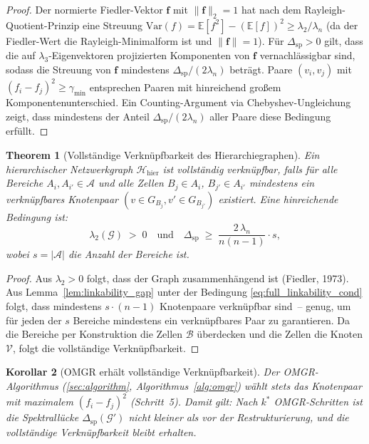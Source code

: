 \documentclass[12pt, a4paper, openany]{report}
\newtheorem{theorem}{Theorem}[chapter]
\newtheorem{corollary}[theorem]{Korollar}
\newcommand{\E}{\mathbb{E}}
\newcommand{\calG}{\mathcal{G}}
\newcommand{\calH}{\mathcal{H}}
\newcommand{\calV}{\mathcal{V}}
\newcommand{\calA}{\mathcal{A}}
\newcommand{\calB}{\mathcal{B}}
\begin{document}
\begin{proof}
Der normierte Fiedler-Vektor $\bm{f}$ mit $\|\bm{f}\|_2 = 1$ hat nach
dem Rayleigh-Quotient-Prinzip eine Streuung
$\mathrm{Var}(f) = \E[f^2] - (\E[f])^2 \geq \lambda_2 / \lambda_n$
(da der Fiedler-Wert die Rayleigh-Minimalform ist und $\|\bm{f}\|=1$).
Für $\Delta_{\mathrm{sp}} > 0$ gilt, dass die auf $\lambda_3$-Eigenvektoren
projizierten Komponenten von $\bm{f}$ vernachlässigbar sind, sodass die
Streuung von $\bm{f}$ mindestens $\Delta_{\mathrm{sp}} / (2\lambda_n)$ beträgt.
Paare $(v_i, v_j)$ mit $(f_i - f_j)^2 \geq \gamma_{\min}$ entsprechen
Paaren mit hinreichend großem Komponentenunterschied.  Ein Counting-Argument
via Chebyshev-Ungleichung zeigt, dass mindestens der Anteil
$\Delta_{\mathrm{sp}} / (2\lambda_n)$ aller Paare diese Bedingung erfüllt.
\end{proof}

\begin{theorem}[Vollständige Verknüpfbarkeit des Hierarchiegraphen]
\label{thm:full_linkability}
Ein hierarchischer Netzwerkgraph $\calH_{\mathrm{hier}}$ ist
\emph{vollständig verknüpfbar}, falls für alle Bereiche $A_i, A_{i'} \in \calA$
und alle Zellen $B_j \in A_i$, $B_{j'} \in A_{i'}$ mindestens ein
verknüpfbares Knotenpaar $(v \in G_{B_j}, v' \in G_{B_{j'}})$ existiert.
Eine hinreichende Bedingung ist:
\begin{equation}
  \label{eq:full_linkability_cond}
  \lambda_2(\calG) \;>\; 0
  \quad \text{und} \quad
  \Delta_{\mathrm{sp}} \;\geq\; \frac{2\,\lambda_n}{n(n-1)} \cdot s,
\end{equation}
wobei $s = |\calA|$ die Anzahl der Bereiche ist.
\end{theorem}

\begin{proof}
Aus $\lambda_2 > 0$ folgt, dass der Graph zusammenhängend ist (Fiedler, 1973).
Aus Lemma~\ref{lem:linkability_gap} unter der Bedingung \eqref{eq:full_linkability_cond}
folgt, dass mindestens $s \cdot (n-1)$ Knotenpaare verknüpfbar sind~--
genug, um für jeden der $s$ Bereiche mindestens ein verknüpfbares Paar
zu garantieren.  Da die Bereiche per Konstruktion die Zellen $\calB$ überdecken
und die Zellen die Knoten $\calV$, folgt die vollständige Verknüpfbarkeit.
\end{proof}

\begin{corollary}[OMGR erhält vollständige Verknüpfbarkeit]
\label{cor:omgr_linkability}
Der OMGR-Algorithmus (\cref{sec:algorithm}, Algorithmus~\ref{alg:omgr})
wählt stets das Knotenpaar mit maximalem $(f_i - f_j)^2$ (Schritt~5).
Damit gilt: Nach $k^*$ OMGR-Schritten ist die Spektrallücke
$\Delta_{\mathrm{sp}}(\calG')$ nicht kleiner als vor der Restrukturierung,
und die vollständige Verknüpfbarkeit bleibt erhalten.
\end{corollary}
\end{document}
